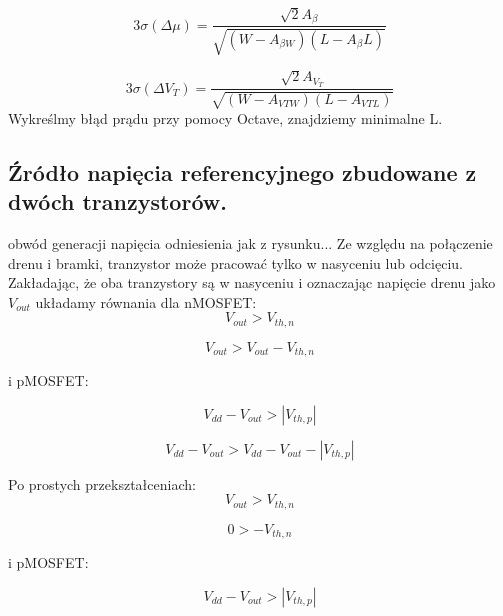 \documentclass[10pt,a4paper]{report}
\begin{document}
{		\begin{equation}
			3 \sigma \left(\Delta \mu \right) = \frac{ \sqrt{2} A_{\beta}  } { \sqrt{ \left(W-A_{\beta W}\right)\left(L-A_{\beta} L\right)}}
		\end{equation}

		\begin{equation}
		3 \sigma \left(\Delta V_T \right) = \frac{ \sqrt{2} A_{V_T}  } { \sqrt{ \left(W-A_{VTW}\right)\left(L-A_{VTL}\right)}}
		\end{equation}
	Wykreślmy błąd prądu przy pomocy Octave, znajdziemy minimalne L.
		
	}
	



	\subsection{Źródło napięcia referencyjnego zbudowane z dwóch tranzystorów.}
	obwód generacji napięcia odniesienia jak z rysunku...
	Ze względu na połączenie drenu i bramki, tranzystor może pracować tylko w nasyceniu lub odcięciu. Zakładając, że oba tranzystory
	są w nasyceniu i oznaczając napięcie drenu jako $V_{out}$ układamy równania dla nMOSFET:
	\begin{equation}
	V_{out} > V_{th,n}
	\end{equation}
	
	\begin{equation}
	V_{out} > V_{out} - V_{th,n}
	\end{equation}
	
	i pMOSFET:
	
	\begin{equation}
	V_{dd} - V_{out} > \left|V_{th,p}\right|
	\end{equation}
	
	\begin{equation}
	V_{dd} - V_{out} > V_{dd} - V_{out} - \left|V_{th,p}\right|
	\end{equation}
	
	Po prostych przekształceniach:
	\begin{equation}
	V_{out} > V_{th,n}
	\end{equation}
	
	\begin{equation}
	0 > - V_{th,n}
	\end{equation}
	
	i pMOSFET:
	
	\begin{equation}
	V_{dd} - V_{out} > \left|V_{th,p}\right|
	\end{equation}
	
\end{document}
